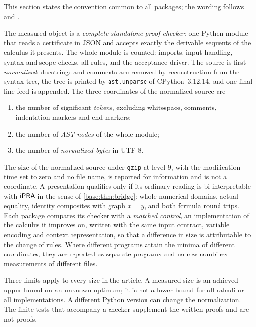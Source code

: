 This section states the convention common to all packages; the wording
follows  and .

\begin{definition}
\label{base:def:measure}
The measured object is a \emph{complete standalone proof checker}: one
Python module that reads a certificate in JSON and accepts exactly the
derivable sequents of the calculus it presents.  The whole module is
counted: imports, input handling, syntax and scope checks, all rules, and
the acceptance driver.  The source is first \emph{normalized}: docstrings
and comments are removed by reconstruction from the syntax tree, the tree is
printed by \texttt{ast.unparse} of CPython~3.12.14, and one final line feed
is appended.  The three coordinates of the normalized source are
\begin{enumerate}[label=\textup{(\roman*)}]
\item the number of significant \emph{tokens}, excluding whitespace,
 comments, indentation markers and end markers;
\item the number of \emph{AST nodes} of the whole module;
\item the number of \emph{normalized bytes} in UTF-8.
\end{enumerate}
\end{definition}

The size of the normalized source under \texttt{gzip} at level $9$, with the
modification time set to zero and no file name, is reported for information
and is not a coordinate.  A presentation qualifies only if its ordinary
reading is bi-interpretable with $\mathsf{iPRA}$ in the sense of
\cref{base:thm:bridge}: whole numerical domains, actual equality, identity
composites with graph $x=y$, and both formula round trips.  Each package
compares its checker with a \emph{matched control}, an implementation of
the calculus it improves on, written with the same input contract, variable
encoding and context representation, so that a difference in size is
attributable to the change of rules.  Where different programs attain the
minima of different coordinates, they are reported as separate programs and
no row combines measurements of different files.

Three limits apply to every size in the article.  A measured size is an
achieved upper bound on an unknown optimum; it is not a lower bound for all
calculi or all implementations.  A different Python version can change the
normalization.  The finite tests that accompany a checker supplement the
written proofs and are not proofs.

